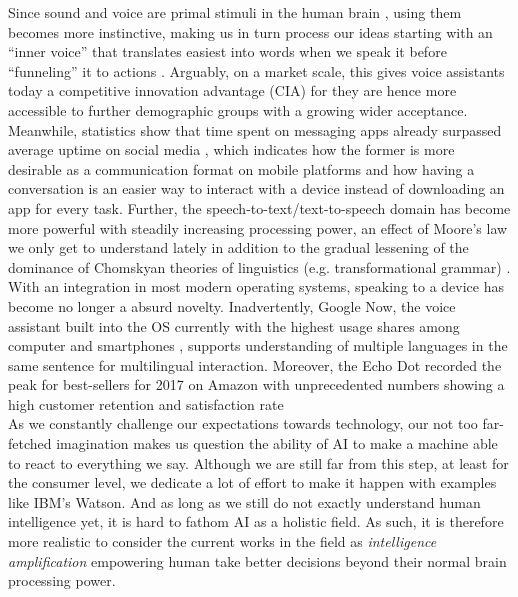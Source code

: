 Since sound and voice are primal stimuli in the human brain \cite{voiceneurons}, using them becomes more instinctive, making us in turn process our ideas starting with an ``inner voice'' that translates easiest into words when we speak it before ``funneling'' it to actions \cite{alexapc18}.
Arguably, on a market scale, this gives voice assistants today a competitive innovation advantage (CIA) for they are hence more accessible to further demographic groups with a growing wider acceptance.\\

Meanwhile, statistics \cite{businsider} show that time spent on messaging apps already surpassed average uptime on social media , which indicates how the former is more desirable as a communication format on mobile platforms and how having a conversation is an easier way to interact with a device instead of downloading an app for every task. 
Further, the speech-to-text/text-to-speech domain has become more powerful with steadily increasing processing power, an effect of Moore's law we only get to understand lately in addition to the gradual lessening of the dominance of Chomskyan theories of linguistics (e.g. transformational grammar) \cite{wiki:nlp}.
With an integration in most modern operating systems, speaking to a device has become no longer a absurd novelty. 
Inadvertently, Google Now, the voice assistant built into the OS currently with the highest usage shares among computer and smartphones \cite{wiki:gartnerreports}, supports understanding of multiple languages in the same sentence for multilingual interaction.
Moreover, the Echo Dot recorded the peak for best-sellers for 2017 on Amazon with unprecedented numbers showing a high customer retention and satisfaction rate \cite{cnbcAlexa}\\

As we constantly challenge our expectations towards technology, our not too far-fetched imagination makes us question the ability of AI to make a machine able to react to everything we say.
Although we are still far from this step, at least for the consumer level, we dedicate a lot of effort to make it happen with examples like IBM's Watson.
And as long as we still do not exactly understand human intelligence yet, it is hard to fathom AI as a holistic field. As such, it is therefore more realistic to consider the current works in the field as \textit{intelligence amplification} \cite{alexapc18} empowering human take better decisions beyond their normal brain processing power.
\\

